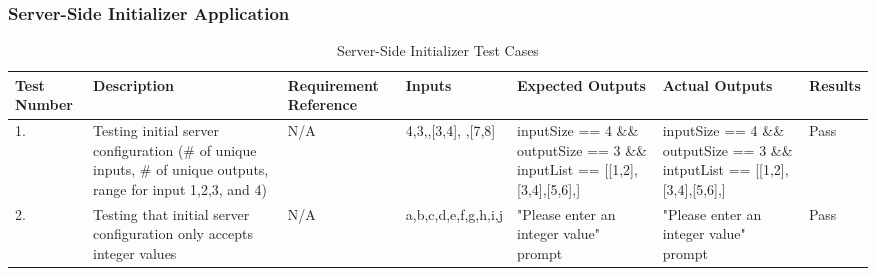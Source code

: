 \documentclass[12pt, titlepage]{article}
\begin{document}
\fancyhf{}
\fancyhead[C]{\thepage}
\renewcommand{\headrulewidth}{0pt}
\pagestyle{plain}

\subsubsection{Server-Side Initializer Application}
\begin{center}
    \begin{table}[H]
        \centering
        \begin{tabular}{|p{1cm}|p{2.2cm}|p{2.5cm}|p{1.7cm}|p{2.6cm}|p{2.6cm}|p{1.5cm}|}
        \hline
        \bf Test Number & \bf Description & \bf Requirement Reference & \bf Inputs & \bf Expected Outputs & \bf Actual Outputs & \bf Results \\
        \hline
        1. & Testing initial server configuration (\# of unique inputs, \# of unique outputs, range for input 1,2,3, and 4) & N/A & 4,3,\newline [1,2],[3,4], \newline [5,6],[7,8] & inputSize == 4 \&\& outputSize == 3 \&\& inputList == [[1,2],[3,4],[5,6],\newline [7,8]] & inputSize == 4 \&\& outputSize == 3 \&\& intputList == [[1,2],[3,4],[5,6],\newline [7,8]] & Pass\\
        \hline
        2. & Testing that initial server configuration only accepts integer values & N/A & a,b,c,d,e,f,\newline g,h,i,j & "Please enter an integer value" prompt & "Please enter an integer value" prompt & Pass\\
        \hline
        \end{tabular}
        \caption{Server-Side Initializer Test Cases}
        \label{tab:my_label1}
    \end{table}
\end{center}
\fancyhf{}
\fancyhead[C]{\thepage}
\renewcommand{\headrulewidth}{0pt}
\pagestyle{plain}
\end{document}
